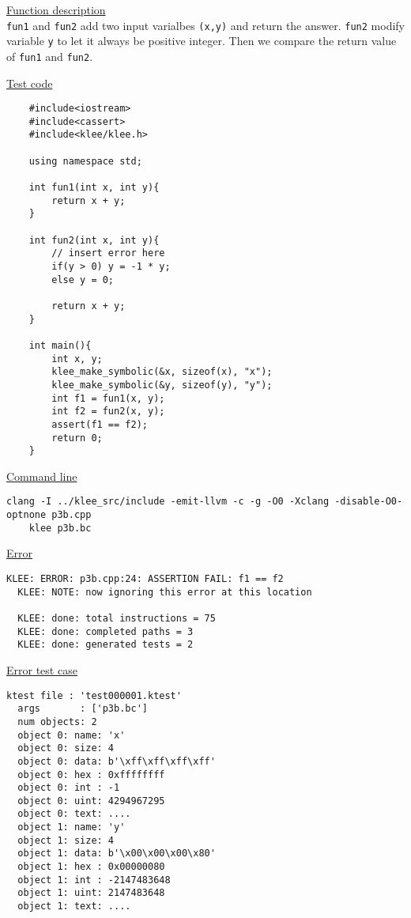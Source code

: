 \documentclass[12pt,letterpaper]{article}
\begin{document}
\begin{mdframed}
  \noindent\underline{Function description}\\
  \texttt{fun1} and \texttt{fun2} add two input varialbes \texttt{(x,y)} and return the answer.
  \texttt{fun2} modify variable \texttt{y} to let it always be positive integer.
  Then we compare the return value of \texttt{fun1} and \texttt{fun2}.

  \noindent\underline{Test code}
  \begin{lstlisting}
    #include<iostream>
    #include<cassert>
    #include<klee/klee.h>

    using namespace std;

    int fun1(int x, int y){
        return x + y;
    }

    int fun2(int x, int y){
        // insert error here
        if(y > 0) y = -1 * y;
        else y = 0;

        return x + y;
    }

    int main(){
        int x, y;
        klee_make_symbolic(&x, sizeof(x), "x");
        klee_make_symbolic(&y, sizeof(y), "y");
        int f1 = fun1(x, y);
        int f2 = fun2(x, y);
        assert(f1 == f2);
        return 0;
    }
  \end{lstlisting}

  \noindent\underline{Command line}
  \begin{lstlisting}[basicstyle=\tiny]
    clang -I ../klee_src/include -emit-llvm -c -g -O0 -Xclang -disable-O0-optnone p3b.cpp
    klee p3b.bc
  \end{lstlisting}

  \noindent\underline{Error}
  \begin{lstlisting}[basicstyle=\tiny]
  KLEE: ERROR: p3b.cpp:24: ASSERTION FAIL: f1 == f2
  KLEE: NOTE: now ignoring this error at this location

  KLEE: done: total instructions = 75
  KLEE: done: completed paths = 3
  KLEE: done: generated tests = 2
  \end{lstlisting}

  \noindent\underline{Error test case}
  \begin{lstlisting}[basicstyle=\tiny]
  ktest file : 'test000001.ktest'
  args       : ['p3b.bc']
  num objects: 2
  object 0: name: 'x'
  object 0: size: 4
  object 0: data: b'\xff\xff\xff\xff'
  object 0: hex : 0xffffffff
  object 0: int : -1
  object 0: uint: 4294967295
  object 0: text: ....
  object 1: name: 'y'
  object 1: size: 4
  object 1: data: b'\x00\x00\x00\x80'
  object 1: hex : 0x00000080
  object 1: int : -2147483648
  object 1: uint: 2147483648
  object 1: text: ....
  \end{lstlisting}
\end{mdframed}
\end{document}
